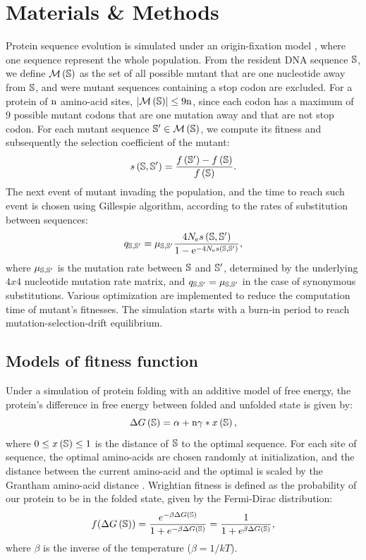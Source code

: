 \documentclass{article}
\begin{document}
	\section*{Materials \& Methods}
	Protein sequence evolution is simulated under an origin-fixation model \cite{McCandlish2014}, where one sequence represent the whole population.
	From the resident DNA sequence $\mathbb{S}$, we define $\mathcal{M}\left(\mathbb{S}\right)$ as the set of all possible mutant that are one nucleotide away from $\mathbb{S}$, and were mutant sequences containing a stop codon are excluded.
	For a protein of $\text{n}$ amino-acid sites, $\left| \mathcal{M}\left(\mathbb{S}\right) \right| \leq 9 \text{n}$, since each codon has a maximum of $9$ possible mutant codons that are one mutation away and that are not stop codon.
	For each mutant sequence $\mathbb{S}' \in \mathcal{M}\left(\mathbb{S}\right)$, we compute its fitness and subsequently the selection coefficient of the mutant:
	\begin{equation}
	s \left( \mathbb{S},\mathbb{S}'\right) = \dfrac{ f \left(\mathbb{S}' \right) - f \left(\mathbb{S}\right) }{f\left( \mathbb{S} \right)}.
	\end{equation}
	The next event of mutant invading the population, and the time to reach such event is chosen using Gillespie algorithm, according to the rates of substitution between sequences:
	\begin{equation}
	q_{\mathbb{S}, \mathbb{S}'} = \mu_{\mathbb{S}, \mathbb{S}'} \dfrac{4 N_{\mathrm{e}} s \left( \mathbb{S},\mathbb{S}'\right)}{1 - \mathrm{e}^{-4 N_{\mathrm{e}} s \left( \mathbb{S},\mathbb{S}'\right)}}, 
	\end{equation}
	where $\mu_{\mathbb{S}, \mathbb{S}'}$ is the mutation rate between $\mathbb{S}$ and $\mathbb{S}'$, determined by the underlying $4x4$ nucleotide mutation rate matrix, and ${q_{\mathbb{S}, \mathbb{S}'}} = \mu_{\mathbb{S}, \mathbb{S}'}$ in the case of synonymous substitutions.
	Various optimization are implemented to reduce the computation time of mutant's fitnesses.
	The simulation starts with a burn-in period to reach mutation-selection-drift equilibrium.
	\subsection*{Models of fitness function}
	\label{MatMet:folding}
	Under a simulation of protein folding with an additive model of free energy, the protein's difference in free energy between folded and unfolded state is given by:
	\begin{equation*}
	\Delta G\left(\mathbb{S}\right) = \alpha + \text{n} \gamma * x\left(\mathbb{S}\right), 
	\end{equation*}
	where $0 \leq x\left(\mathbb{S}\right) \leq 1$ is the distance of $\mathbb{S}$ to the optimal sequence.
	For each site of sequence, the optimal amino-acids are chosen randomly at initialization, and the distance between the current amino-acid and the optimal is scaled by the Grantham amino-acid distance \cite{Grantham1974}.
	Wrightian fitness is defined as the probability of our protein to be in the folded state, given by the Fermi-Dirac distribution: 
	\begin{equation}
	f(\Delta G\left(\mathbb{S}\right)) = \dfrac{e^{-\beta \Delta G\left(\mathbb{S}\right) }}{1 + e^{-\beta \Delta G\left(\mathbb{S}\right) }} = \dfrac{1}{1 + e^{\beta \Delta G\left(\mathbb{S}\right) }}, 
	\end{equation}
	where $\beta$ is the inverse of the temperature ($\beta=1/kT$).
	
\end{document}
